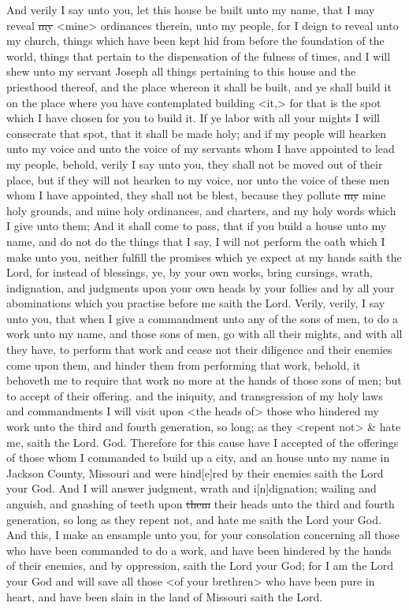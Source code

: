 				And verily I say unto you, let this house be built unto my name, that I may reveal \sout{my} <mine> ordinances therein, unto my people, for I deign to reveal unto my church, things which have been kept hid from before the foundation of the world, things that pertain to the dispensation of the fulness of times, and I will shew unto my servant Joseph all things pertaining to this house and the priesthood thereof, and the place whereon it shall be built, and ye shall build it on the place where you have contemplated building <it,> for that is the spot which I have chosen for you to build it. If ye labor with all your mights I will consecrate that spot, that it shall be made holy; and if my people will hearken unto my voice and unto the voice of my servants whom I have appointed to lead my people, behold, verily I say unto you, they shall not be moved out of their place, but if they will not hearken to my voice, nor unto the voice of these men whom I have appointed, they shall not be blest, because they pollute \sout{my} mine holy grounds, and mine holy ordinances, and charters, and my holy words which I give unto them; And it shall come to pass, that if you build a house unto my name, and do not do the things that I say, I will not perform the oath which I make unto you, neither fulfill the promises which ye expect at my hands saith the Lord, for instead of blessings, ye, by your own works, bring cursings, wrath, indignation, and judgments upon your own heads by your follies and by all your abominations which you practise before me saith the Lord. Verily, verily, I say unto you, that when I give a commandment unto any of the sons of men, to do a work unto my name, and those sons of men, go with all their mights, and with all they have, to perform that work and cease not their diligence and their enemies come upon them, and hinder them from performing that work, behold, it behoveth me to require that work no more at the hands of those sons of men; but to accept of their offering. and the iniquity, and transgression of my holy laws and commandments I will visit upon <the heads of> those who hindered my work unto the third and fourth generation, so long; as they <repent not> \& hate me, saith the Lord. God. Therefore for this cause have I accepted of the offerings of those whom I commanded to build up a city, and an house unto my name in Jackson County, Missouri and were hind[e]red by their enemies saith the Lord your God. And I will answer judgment, wrath and i[n]dignation; wailing and anguish, and gnashing of teeth upon \sout{them} their heads unto the third and fourth generation, so long as they repent not, and hate me saith the Lord your God. And this, I make an ensample unto you, for your consolation concerning all those who have been commanded to do a work, and have been hindered by the hands of their enemies, and by oppression, saith the Lord your God; for I am the Lord your God and will save all those <of your brethren> who have been pure in heart, and have been slain in the land of Missouri saith the Lord.

